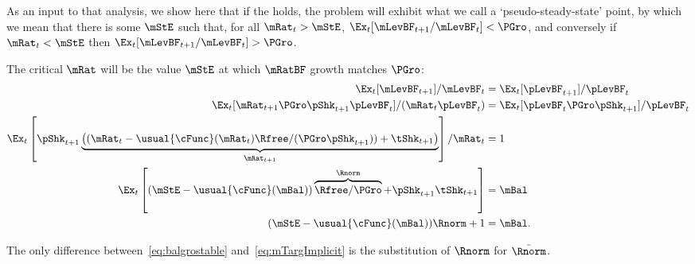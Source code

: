 \documentclass[BufferStockTheory]{subfiles}
\begin{document}
As an input to that analysis, we show here that if the {\GIC} holds, the problem will exhibit what we call a `pseudo-steady-state' point, by which we mean that there is some ${\mStE}$ such that, for all $\mRat_{t}>{\mStE}$, $\Ex_{t}[\mLevBF_{t+1}/\mLevBF_{t}] < \PGro$, and conversely if $\mRat_{t}<{\mStE}$ then $\Ex_{t}[\mLevBF_{t+1}/\mLevBF_{t}] > \PGro$.  %

\hypertarget{balgrostable}{}
\hypertarget{balgrostableSolve}{}

The critical $\mRat$ will be the value $\mStE$ at which $\mRatBF$ growth matches $\PGro$:
\begin{equation}\label{eq:balgrostable}
  \begin{split}
    \Ex_{t}[\mLevBF_{t+1}]/\mLevBF_{t} & =\Ex_{t}[\pLevBF_{t+1}]/\pLevBF_{t} 
    \\  \Ex_{t}[\mRat_{t+1}\PGro\pShk_{t+1}\pLevBF_{t}]/(\mRat_{t}\pLevBF_{t}) & =\Ex_{t}[\pLevBF_{t}\PGro\pShk_{t+1}]/\pLevBF_{t} 
    \\ \Ex_{t}\left[\pShk_{t+1}\underbrace{\left((\mRat_{t}-\usual{\cFunc}(\mRat_{t})\Rfree/(\PGro\pShk_{t+1}))+\tShk_{t+1}\right)}_{\mRat_{t+1}}\right]/\mRat_{t} & = 1 
    \\
    \Ex_{t}\left[(\mStE-\usual{\cFunc}(\mBal))\overbrace{\Rfree/\PGro}^{\Rnorm}+\pShk_{t+1}\tShk_{t+1}\right] & = \mBal 
    \\  (\mStE-\usual{\cFunc}(\mBal))\Rnorm+ 1 & = \mBal .
  \end{split}
\end{equation}

The only difference between~\eqref{eq:balgrostable} and~\eqref{eq:mTargImplicit} is the substitution of $\Rnorm$ for $\bar{\Rnorm}$.
\end{document}
